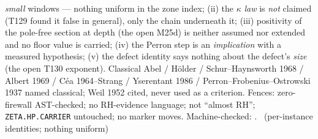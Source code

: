 \emph{small} windows --- nothing uniform in the zone index; (ii) the $\kappa$
\emph{law} is \emph{not} claimed (T129 found it false in general), only the
chain underneath it; (iii) positivity of the pole-free section at depth (the
open M25d) is neither assumed nor extended and no floor value is carried;
(iv) the Perron step is an \emph{implication} with a measured hypothesis;
(v) the defect identity says nothing about the defect's \emph{size} (the open
T130 exponent). Classical Abel / H\"older / Schur--Haynsworth 1968 /
Albert 1969 / C\'ea 1964--Strang / Yserentant 1986 /
Perron--Frobenius--Ostrowski 1937 named classical; Weil 1952 cited, never used
as a criterion. Fences: zero-firewall AST-checked; no RH-evidence language;
not ``almost RH''; \texttt{ZETA.HP.CARRIER} untouched; no marker moves.
Machine-checked: .
\mE\ (per-instance identities; nothing uniform)


